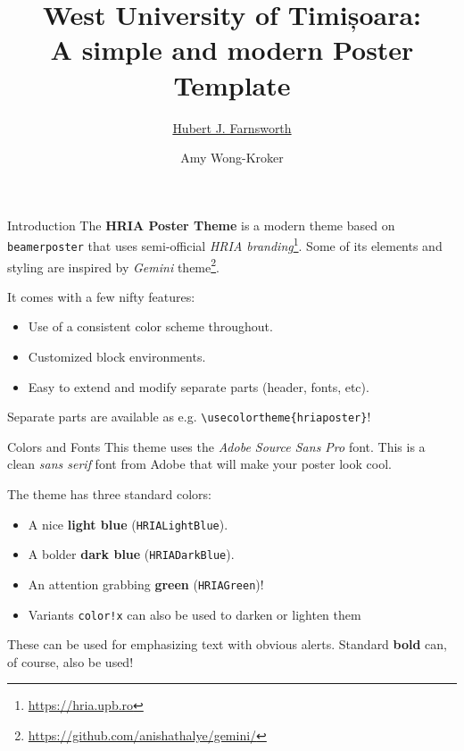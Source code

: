 \documentclass[final]{beamer}
\title{West University of Timișoara: \\ A simple and modern Poster Template}
\author{\underline{Hubert J. Farnsworth}\inst{1} \and Amy Wong-Kroker\inst{2}}
\institute[shortinst]{\inst{1} Academy of Science, New New York \quad \inst{2} Mars University}
\begin{document}
\begin{frame}[t,fragile]

\begin{block}{Introduction}
    The \textbf{HRIA Poster Theme} is a modern theme based on \texttt{beamerposter} that
    uses semi-official \emph{HRIA branding}\footnote{\url{https://hria.upb.ro}}. Some
    of its elements and styling are inspired by \emph{Gemini}
    theme\footnote{\url{https://github.com/anishathalye/gemini/}}.

    \medskip
    It comes with a few nifty features:
    \begin{itemize}
        \item Use of a consistent color scheme throughout.
        \item Customized block environments.
        \item Easy to extend and modify separate parts (header, fonts, etc).
    \end{itemize}

    \medskip
    Separate parts are available as e.g. \texttt{\textbackslash usecolortheme\{hriaposter\}}!
\end{block}

\begin{block}{Colors and Fonts}
    This theme uses the \emph{Adobe Source Sans Pro} font. This is a clean \emph{sans serif}
    font from Adobe that will make your poster look cool.

    \medskip
    The theme has three standard colors:
    \begin{itemize}
        \item A nice \textcolor{HRIALightBlue}{\textbf{light blue}} (\texttt{HRIALightBlue}).
        \item A bolder \textcolor{HRIADarkBlue}{\textbf{dark blue}} (\texttt{HRIADarkBlue}).
        \item An attention grabbing \textcolor{HRIAGreen}{\textbf{green}}
        (\texttt{HRIAGreen})!
        \item Variants \texttt{color!x} can also be used to darken or lighten them
    \end{itemize}

    \medskip
    These can be used for emphasizing text with obvious \alert{alerts}. Standard
    \textbf{bold} can, of course, also be used!
\end{block}


\end{frame}
\end{document}
